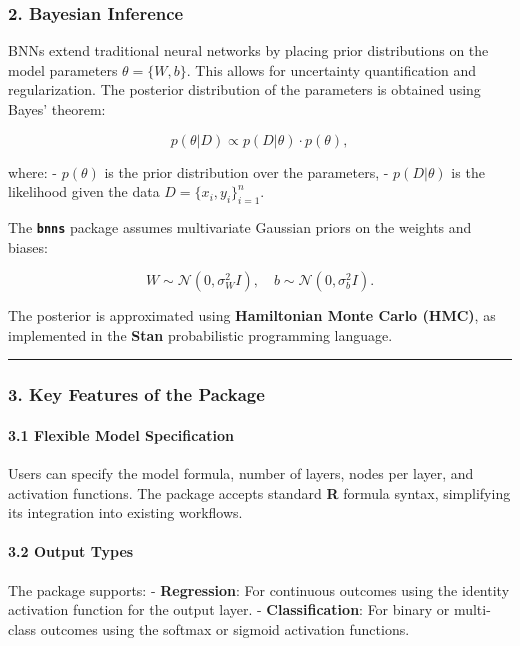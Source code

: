 \documentclass[
]{jss}
\begin{document}
\subsubsection{2. Bayesian Inference}\label{bayesian-inference}

BNNs extend traditional neural networks by placing prior distributions
on the model parameters \(\theta = \{W, b\}\). This allows for
uncertainty quantification and regularization. The posterior
distribution of the parameters is obtained using Bayes' theorem:

\[
p(\theta | D) \propto p(D | \theta) \cdot p(\theta),
\]

where: - \(p(\theta)\) is the prior distribution over the parameters, -
\(p(D | \theta)\) is the likelihood given the data
\(D = \{x_i, y_i\}_{i=1}^n\).

The \textbf{\texttt{bnns}} package assumes multivariate Gaussian priors
on the weights and biases:

\[
W \sim \mathcal{N}(0, \sigma^2_W I), \quad b \sim \mathcal{N}(0, \sigma^2_b I).
\]

The posterior is approximated using \textbf{Hamiltonian Monte Carlo
(HMC)}, as implemented in the \textbf{Stan} probabilistic programming
language.

\begin{center}\rule{0.5\linewidth}{0.5pt}\end{center}

\subsubsection{3. Key Features of the
Package}\label{key-features-of-the-package}

\paragraph{3.1 Flexible Model
Specification}\label{flexible-model-specification}

Users can specify the model formula, number of layers, nodes per layer,
and activation functions. The package accepts standard \textbf{R}
formula syntax, simplifying its integration into existing workflows.

\paragraph{3.2 Output Types}\label{output-types}

The package supports: - \textbf{Regression}: For continuous outcomes
using the identity activation function for the output layer. -
\textbf{Classification}: For binary or multi-class outcomes using the
softmax or sigmoid activation functions.
\end{document}
